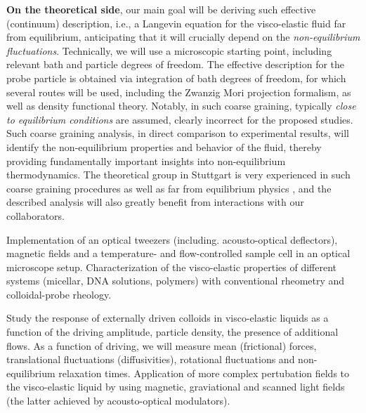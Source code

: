 \begin{workpackage}
\begin{wpdescription}
{\bf On the theoretical side}, our main goal will be deriving such effective (continuum)
description, i.e., a Langevin equation for the visco-elastic fluid far from equilibrium,
anticipating that it will crucially depend on the {\it non-equilibrium
  fluctuations}. Technically, we will use a microscopic starting point, including relevant
bath and particle degrees of freedom. The effective description for the probe particle is
obtained via integration of bath degrees of freedom, for which several routes will be used,
including the Zwanzig Mori projection formalism, as well as density functional
theory. Notably, in such coarse graining, typically {\it close to equilibrium conditions}
are assumed, clearly incorrect for the proposed studies. Such coarse graining analysis, in
direct comparison to experimental results, will identify the non-equilibrium properties and
behavior of the fluid, thereby providing fundamentally important insights into
non-equilibrium thermodynamics. The theoretical group in Stuttgart is very experienced in
such coarse graining procedures \cite{Aerov14} as well as far from equilibrium physics \cite{Kruger11,Kruger09}, and the described analysis will also
greatly benefit from interactions with our collaborators.


\end{wpdescription}

\begin{tasklist}

\begin{task}[title=Experimental setup,id=brown-t1,PM=24,lead=USTUTT,wphases=0-24!0.5]
Implementation of an optical tweezers (including. acousto-optical deflectors), magnetic fields and a temperature- and flow-controlled sample cell in an optical microscope setup. Characterization of the visco-elastic properties of different systems (micellar, DNA solutions, polymers) with conventional rheometry and colloidal-probe rheology. 
\end{task}


\begin{task}[title=Externally driven particles in viscoelastic baths,id=brown-t2,PM=24,lead=USTUTT,wphases=0-24!0.5]
Study the response of externally driven colloids in visco-elastic liquids as a function of the driving amplitude, particle density, the presence of additional flows. As a function of driving, we will
measure mean (frictional) forces, translational fluctuations (diffusivities), rotational
fluctuations and non-equilibrium relaxation times. Application of more complex pertubation fields to the visco-elastic liquid by using magnetic, graviational and scanned light fields (the latter achieved by acousto-optical modulators).
\end{task}


\end{tasklist}
\end{workpackage}
